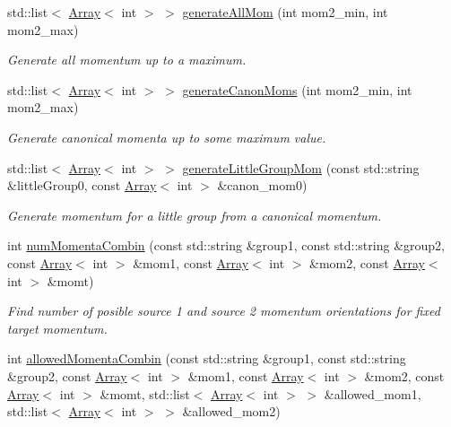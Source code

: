 \begin{DoxyCompactItemize}
std\+::list$<$ \mbox{\hyperlink{classXMLArray_1_1Array}{Array}}$<$ int $>$ $>$ \mbox{\hyperlink{namespaceHadron_aa0ad60c011c7668c5389ce9286b3c8dd}{generate\+All\+Mom}} (int mom2\+\_\+min, int mom2\+\_\+max)
\begin{DoxyCompactList}\small\item\em Generate all momentum up to a maximum. \end{DoxyCompactList}\item 
std\+::list$<$ \mbox{\hyperlink{classXMLArray_1_1Array}{Array}}$<$ int $>$ $>$ \mbox{\hyperlink{namespaceHadron_af42e0a1c54e10b67abac83c56c67b40e}{generate\+Canon\+Moms}} (int mom2\+\_\+min, int mom2\+\_\+max)
\begin{DoxyCompactList}\small\item\em Generate canonical momenta up to some maximum value. \end{DoxyCompactList}\item 
std\+::list$<$ \mbox{\hyperlink{classXMLArray_1_1Array}{Array}}$<$ int $>$ $>$ \mbox{\hyperlink{namespaceHadron_a12d4f9d40cac2700ebb7a7420f20987b}{generate\+Little\+Group\+Mom}} (const std\+::string \&little\+Group0, const \mbox{\hyperlink{classXMLArray_1_1Array}{Array}}$<$ int $>$ \&canon\+\_\+mom0)
\begin{DoxyCompactList}\small\item\em Generate momentum for a little group from a canonical momentum. \end{DoxyCompactList}\item 
int \mbox{\hyperlink{namespaceHadron_afc213211f9c79372b449aac381596d1c}{num\+Momenta\+Combin}} (const std\+::string \&group1, const std\+::string \&group2, const \mbox{\hyperlink{classXMLArray_1_1Array}{Array}}$<$ int $>$ \&mom1, const \mbox{\hyperlink{classXMLArray_1_1Array}{Array}}$<$ int $>$ \&mom2, const \mbox{\hyperlink{classXMLArray_1_1Array}{Array}}$<$ int $>$ \&momt)
\begin{DoxyCompactList}\small\item\em Find number of posible source 1 and source 2 momentum orientations for fixed target momentum. \end{DoxyCompactList}\item 
int \mbox{\hyperlink{namespaceHadron_a9aa2554e3522f9947be804d36603b887}{allowed\+Momenta\+Combin}} (const std\+::string \&group1, const std\+::string \&group2, const \mbox{\hyperlink{classXMLArray_1_1Array}{Array}}$<$ int $>$ \&mom1, const \mbox{\hyperlink{classXMLArray_1_1Array}{Array}}$<$ int $>$ \&mom2, const \mbox{\hyperlink{classXMLArray_1_1Array}{Array}}$<$ int $>$ \&momt, std\+::list$<$ \mbox{\hyperlink{classXMLArray_1_1Array}{Array}}$<$ int $>$ $>$ \&allowed\+\_\+mom1, std\+::list$<$ \mbox{\hyperlink{classXMLArray_1_1Array}{Array}}$<$ int $>$ $>$ \&allowed\+\_\+mom2)

\end{DoxyCompactItemize}

